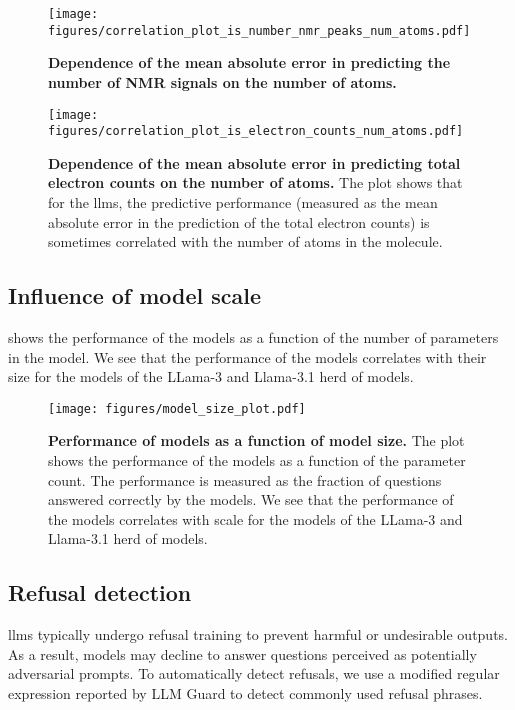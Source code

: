 \begin{figure}[!h]
    \centering
    \texttt{[image: figures/correlation\_plot\_is\_number\_nmr\_peaks\_num\_atoms.pdf]}
    \caption{\textbf{Dependence of the mean absolute error in predicting the number of NMR signals on the number of atoms.} }
    \label{fig:correlation_plot_is_number_nmr_peaks_num_atoms}
\end{figure}


\begin{figure}[!h]
    \centering
    \texttt{[image: figures/correlation\_plot\_is\_electron\_counts\_num\_atoms.pdf]}
    \caption{\textbf{Dependence of the mean absolute error in predicting total electron counts on the number of atoms.} The plot shows that for the \glspl{llm}, the predictive performance (measured as the mean absolute error in the prediction of the total electron counts) is sometimes correlated with the number of atoms in the molecule.}
    \label{fig:correlation_plot_is_electron_counts_num_atoms}
\end{figure}


\clearpage
\subsection{Influence of model scale}
 shows the performance of the models as a function of the number of parameters in the model.
We see that the performance of the models correlates with their size for the models of the LLama-3 and Llama-3.1 herd of models.

\begin{figure}[!h]
    \centering
    \texttt{[image: figures/model\_size\_plot.pdf]}
    \caption{\textbf{Performance of models as a function of model size.} The plot shows the performance of the models as a function of the parameter count. The performance is measured as the fraction of questions answered correctly by the models. We see that the performance of the models correlates with scale for the models of the LLama-3 and Llama-3.1 herd of models.}
    \label{fig:model_size_plot}
\end{figure}

\clearpage
\subsection{Refusal detection}
\Glspl{llm} typically undergo refusal training to prevent harmful or undesirable outputs. As a result, models may decline to answer questions perceived as potentially adversarial prompts.
To automatically detect refusals, we use a modified regular expression reported by LLM Guard\autocite{llmguard} to detect commonly used refusal phrases.

